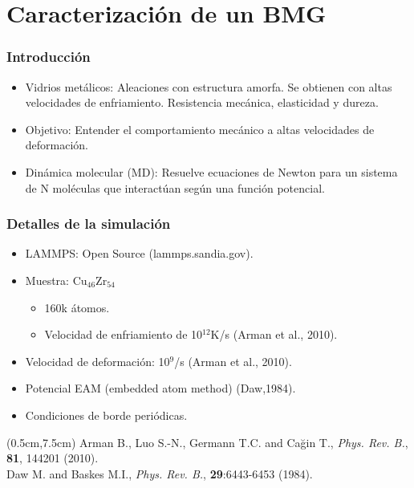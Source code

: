 
\section[Caracterizaci\'on]{Caracterizaci\'on de un BMG}

\begin{frame}
    \frametitle{Introducci\'on}
    \vspace{0.2cm}
    \begin{itemize}
        \item Vidrios met\'alicos: Aleaciones con estructura amorfa. Se obtienen con altas velocidades de enfriamiento. Resistencia mec\'anica, elasticidad y dureza.
        \item Objetivo: Entender el comportamiento mec\'anico a altas velocidades de deformaci\'on.
        \item Din\'amica molecular (MD): Resuelve ecuaciones de Newton para un sistema de N mol\'eculas que interact\'uan seg\'un una funci\'on potencial.
    \end{itemize}
\end{frame}

\begin{frame}
    \frametitle{Detalles de la simulaci\'on}
    \vspace{0.2cm}
    \begin{itemize}
        \item LAMMPS: Open Source (lammps.sandia.gov).
        \item Muestra: Cu$_{46}$Zr$_{54}$
        \begin{itemize}
	  \item 160k \'atomos.
	  \item Velocidad de enfriamiento de 10$^{12}$K/s (Arman et al., 2010).
        \end{itemize}
	\item Velocidad de deformaci\'on: 10$^9$/s (Arman et al., 2010).
	\item Potencial EAM (embedded atom method) (Daw,1984).
	\item Condiciones de borde peri\'odicas.
    \end{itemize}
    \begin{textblock*}{12cm}(0.5cm,7.5cm) %
        \scriptsize{Arman B., Luo S.-N., Germann T.C. and Cağin T., \textit{Phys. Rev. B.}, \textbf{81}, 144201 (2010).\\
        Daw M. and Baskes M.I., \textit{Phys. Rev. B.}, \textbf{29}:6443-6453 (1984).}
    \end{textblock*}
\end{frame}

